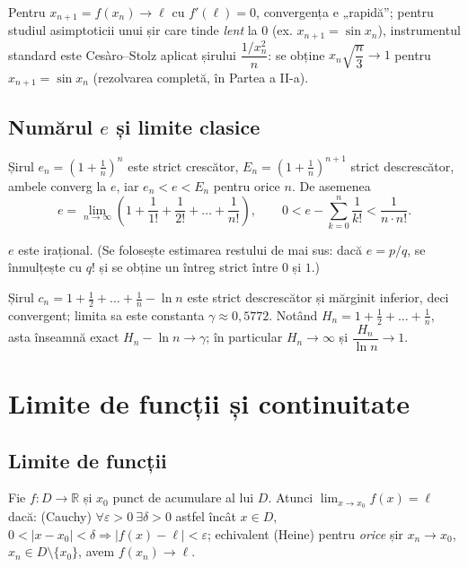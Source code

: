 \begin{obs}
Pentru $x_{n+1}=f(x_n)\to\ell$ cu $f'(\ell)=0$, convergența e „rapidă''; pentru studiul asimptoticii unui șir care tinde \emph{lent} la $0$ (ex. $x_{n+1}=\sin x_n$), instrumentul standard este Cesàro--Stolz aplicat șirului $\dfrac{1/x_n^2}{n}$: se obține $x_n\sqrt{\dfrac n3}\to1$ pentru $x_{n+1}=\sin x_n$ (rezolvarea completă, în Partea a II-a).
\end{obs}

\subsection{Numărul $e$ și limite clasice}

\begin{teorema}
Șirul $e_n=\left(1+\frac1n\right)^n$ este strict crescător, $E_n=\left(1+\frac1n\right)^{n+1}$ strict descrescător, ambele converg la $e$, iar $e_n<e<E_n$ pentru orice $n$. De asemenea
\[
e=\lim_{n\to\infty}\left(1+\frac{1}{1!}+\frac{1}{2!}+\dots+\frac{1}{n!}\right),
\qquad
0<e-\sum_{k=0}^{n}\frac{1}{k!}<\frac{1}{n\cdot n!}.
\]
\end{teorema}

\begin{corolar}
$e$ este irațional. (Se folosește estimarea restului de mai sus: dacă $e=p/q$, se înmulțește cu $q!$ și se obține un întreg strict între $0$ și $1$.)
\end{corolar}

\begin{teorema}
Șirul $c_n=1+\frac12+\dots+\frac1n-\ln n$ este strict descrescător și mărginit inferior, deci convergent; limita sa este constanta $\gamma\approx 0{,}5772$. Notând $H_n=1+\frac12+\dots+\frac1n$, asta înseamnă exact $H_n-\ln n\to\gamma$; în particular $H_n\to\infty$ și $\dfrac{H_n}{\ln n}\to 1$.
\end{teorema}
\section{Limite de funcții și continuitate}

\subsection{Limite de funcții}

\begin{definitie}
Fie $f:D\to\mathbb{R}$ și $x_0$ punct de acumulare al lui $D$. Atunci $\lim_{x\to x_0}f(x)=\ell$ dacă: (Cauchy) $\forall\varepsilon>0\ \exists\delta>0$ astfel încât $x\in D$, $0<|x-x_0|<\delta \Rightarrow |f(x)-\ell|<\varepsilon$; echivalent (Heine) pentru \emph{orice} șir $x_n\to x_0$, $x_n\in D\setminus\{x_0\}$, avem $f(x_n)\to\ell$.
\end{definitie}

